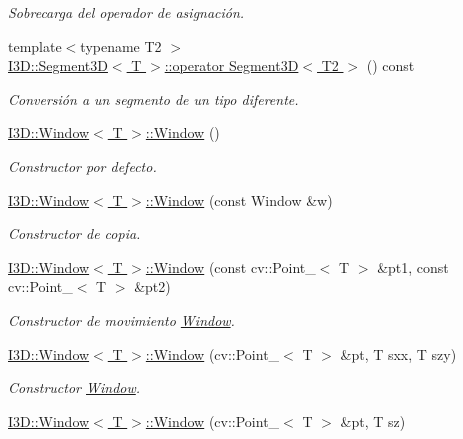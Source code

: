 \begin{DoxyCompactItemize}
\begin{DoxyCompactList}\small\item\em Sobrecarga del operador de asignación. \end{DoxyCompactList}\item 
{\footnotesize template$<$typename T2 $>$ }\\\hyperlink{group___geometric_entities_ga0a05ef1543e77df2c3dc9e40d2126b28}{I3\+D\+::\+Segment3\+D$<$ T $>$\+::operator Segment3\+D$<$ T2 $>$} () const 
\begin{DoxyCompactList}\small\item\em Conversión a un segmento de un tipo diferente. \end{DoxyCompactList}\item 
\hyperlink{group___geometric_entities_ga2d226aaf94cc5ed88652f78ef8403820}{I3\+D\+::\+Window$<$ T $>$\+::\+Window} ()
\begin{DoxyCompactList}\small\item\em Constructor por defecto. \end{DoxyCompactList}\item 
\hyperlink{group___geometric_entities_ga029382701e212fdcae3b72350bb7d9cb}{I3\+D\+::\+Window$<$ T $>$\+::\+Window} (const Window \&w)
\begin{DoxyCompactList}\small\item\em Constructor de copia. \end{DoxyCompactList}\item 
\hyperlink{group___geometric_entities_gaad67f178a66be3d3555c75c9999f2403}{I3\+D\+::\+Window$<$ T $>$\+::\+Window} (const cv\+::\+Point\+\_\+$<$ T $>$ \&pt1, const cv\+::\+Point\+\_\+$<$ T $>$ \&pt2)
\begin{DoxyCompactList}\small\item\em Constructor de movimiento \hyperlink{class_i3_d_1_1_window}{Window}. \end{DoxyCompactList}\item 
\hyperlink{group___geometric_entities_ga15c278087e96c6d37db30cd667a17591}{I3\+D\+::\+Window$<$ T $>$\+::\+Window} (cv\+::\+Point\+\_\+$<$ T $>$ \&pt, T sxx, T szy)
\begin{DoxyCompactList}\small\item\em Constructor \hyperlink{class_i3_d_1_1_window}{Window}. \end{DoxyCompactList}\item 
\hyperlink{group___geometric_entities_gaa4c7acb8b82826e6fef1d9aeb00e6d2e}{I3\+D\+::\+Window$<$ T $>$\+::\+Window} (cv\+::\+Point\+\_\+$<$ T $>$ \&pt, T sz)

\end{DoxyCompactItemize}
